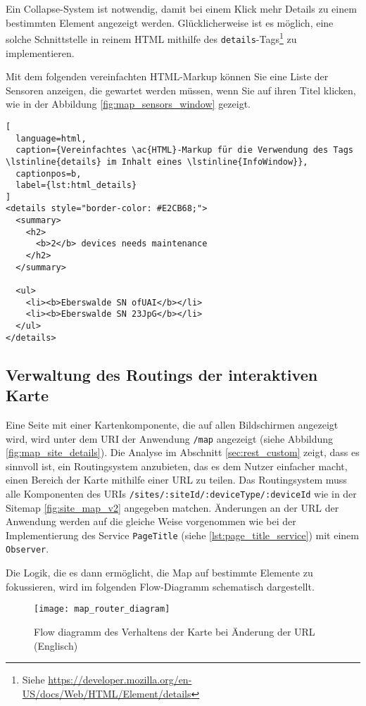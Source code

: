 Ein Collapse-System ist notwendig, damit bei einem Klick mehr Details zu einem bestimmten Element angezeigt werden.
Glücklicherweise ist es möglich, eine solche Schnittstelle in reinem \ac{HTML} mithilfe des \lstinline{details}-Tags\footnote{Siehe \href{https://developer.mozilla.org/en-US/docs/Web/HTML/Element/details}{https://developer.mozilla.org/en-US/docs/Web/HTML/Element/details}} zu implementieren.

Mit dem folgenden vereinfachten HTML-Markup können Sie eine Liste der Sensoren anzeigen, die gewartet werden müssen, wenn Sie auf ihren Titel klicken, wie in der Abbildung \ref{fig:map_sensors_window} gezeigt.

\begin{lstlisting}[
  language=html,
  caption={Vereinfachtes \ac{HTML}-Markup für die Verwendung des Tags \lstinline{details} im Inhalt eines \lstinline{InfoWindow}},
  captionpos=b,
  label={lst:html_details}
]
<details style="border-color: #E2CB68;">
  <summary>
    <h2>
      <b>2</b> devices needs maintenance
    </h2>
  </summary>

  <ul>
    <li><b>Eberswalde SN ofUAI</b></li>
    <li><b>Eberswalde SN 23JpG</b></li>
  </ul>
</details>
\end{lstlisting}

\subsection{Verwaltung des Routings der interaktiven Karte}

Eine Seite mit einer Kartenkomponente, die auf allen Bildschirmen angezeigt wird, wird unter dem \ac{URI} der Anwendung \lstinline{/map} angezeigt (siehe Abbildung \ref{fig:map_site_details}).
Die Analyse im Abschnitt \ref{sec:rest_custom} zeigt, dass es sinnvoll ist, ein Routingsystem anzubieten, das es dem Nutzer einfacher macht, einen Bereich der Karte mithilfe einer \ac{URL} zu teilen.
Das Routingsystem muss alle Komponenten des \ac{URI}s \lstinline{/sites/:siteId/:deviceType/:deviceId} wie in der Sitemap \ref{fig:site_map_v2} angegeben matchen.
Änderungen an der \ac{URL} der Anwendung werden auf die gleiche Weise vorgenommen wie bei der Implementierung des Service \lstinline{PageTitle} (siehe \ref{lst:page_title_service}) mit einem \lstinline{Observer}.

Die Logik, die es dann ermöglicht, die Map auf bestimmte Elemente zu fokussieren, wird im folgenden Flow-Diagramm schematisch dargestellt.

\begin{figure}[H]
  \centering
  \texttt{[image: map\_router\_diagram]}
  \caption{Flow diagramm des Verhaltens der Karte bei Änderung der \ac{URL} (Englisch)}
  \label{fig:map_router_diagram}
\end{figure}

